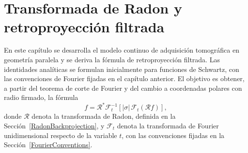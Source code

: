 \chapter{Transformada de Radon y retroproyección filtrada}

En este capítulo se desarrolla el modelo continuo de adquisición tomográfica en geometría paralela y se deriva la fórmula de retroproyección filtrada. Las identidades analíticas se formulan inicialmente para funciones de Schwartz, con las convenciones de Fourier fijadas en el capítulo anterior. El objetivo es obtener, a partir del teorema de corte de Fourier y del cambio a coordenadas polares con radio firmado, la fórmula
\[
f=
\mathcal R^*\mathcal F_t^{-1}
\left[
|\sigma|\,\mathcal F_t(\mathcal Rf)
\right],
\]
donde $\mathcal R$ denota la transformada de Radon, definida en la Sección~\ref{RadonBackprojection}, y $\mathcal F_t$ denota la transformada de Fourier unidimensional respecto de la variable $t$, con las convenciones fijadas en la Sección~\ref{FourierConventions}.






